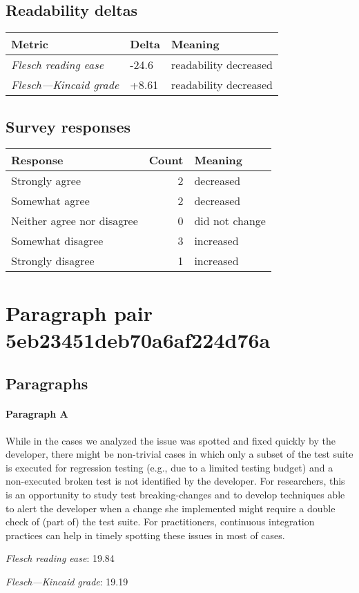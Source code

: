 \subsection{Readability deltas}

\begin{tabular}{lll}
\toprule
               \textbf{Metric} & \textbf{Delta} &       \textbf{Meaning} \\
\midrule
    \emph{Flesch reading ease} &          -24.6 &  readability decreased \\
 \emph{Flesch---Kincaid grade} &          +8.61 &  readability decreased \\
\bottomrule
\end{tabular}

\subsection{Survey responses}
\begin{tabular}{lrl}
\toprule
          \textbf{Response} &  \textbf{Count} & \textbf{Meaning} \\
\midrule
             Strongly agree &               2 &        decreased \\
             Somewhat agree &               2 &        decreased \\
 Neither agree nor disagree &               0 &   did not change \\
          Somewhat disagree &               3 &        increased \\
          Strongly disagree &               1 &        increased \\
\bottomrule
\end{tabular}

\section{Paragraph pair 5eb23451deb70a6af224d76a}
\subsection{Paragraphs}
\paragraph{Paragraph A}
While in the cases we analyzed the issue was spotted and fixed quickly by the developer, there might be non-trivial cases in which only a subset of the test suite is executed for regression testing (e.g., due to a limited testing budget) and a non-executed broken test is not identified by the developer. For researchers, this is an opportunity to study test breaking-changes and to develop techniques able to alert the developer when a change she implemented might require a double check of (part of) the test suite. For practitioners, continuous integration practices can help in timely spotting these issues in most of cases.\par\medskip
\emph{Flesch reading ease}: 19.84\par
\emph{Flesch---Kincaid grade}: 19.19

